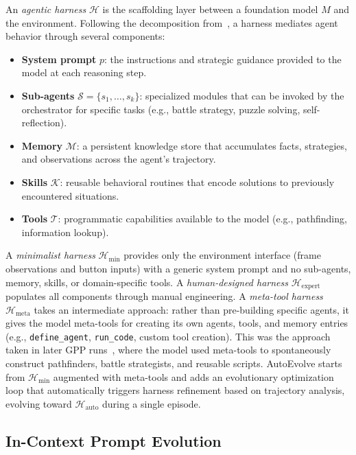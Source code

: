 An \emph{agentic harness} $\mathcal{H}$ is the scaffolding layer between a foundation model $M$ and the environment. Following the decomposition from~\citet{karten2025pokeagent}, a harness mediates agent behavior through several components:
\begin{itemize}
    \item \textbf{System prompt} $p$: the instructions and strategic guidance provided to the model at each reasoning step.
    \item \textbf{Sub-agents} $\mathcal{S} = \{s_1, \ldots, s_k\}$: specialized modules that can be invoked by the orchestrator for specific tasks (e.g., battle strategy, puzzle solving, self-reflection).
    \item \textbf{Memory} $\mathcal{M}$: a persistent knowledge store that accumulates facts, strategies, and observations across the agent's trajectory.
    \item \textbf{Skills} $\mathcal{K}$: reusable behavioral routines that encode solutions to previously encountered situations.
    \item \textbf{Tools} $\mathcal{T}$: programmatic capabilities available to the model (e.g., pathfinding, information lookup).
\end{itemize}

A \emph{minimalist harness} $\mathcal{H}_{\min}$ provides only the environment interface (frame observations and button inputs) with a generic system prompt and no sub-agents, memory, skills, or domain-specific tools. A \emph{human-designed harness} $\mathcal{H}_{\text{expert}}$ populates all components through manual engineering. A \emph{meta-tool harness} $\mathcal{H}_{\text{meta}}$ takes an intermediate approach: rather than pre-building specific agents, it gives the model meta-tools for creating its own agents, tools, and memory entries (e.g., \texttt{define\_agent}, \texttt{run\_code}, custom tool creation). This was the approach taken in later GPP runs~\citep{zhang2025gpp}, where the model used meta-tools to spontaneously construct pathfinders, battle strategists, and reusable scripts. AutoEvolve starts from $\mathcal{H}_{\min}$ augmented with meta-tools and adds an evolutionary optimization loop that automatically triggers harness refinement based on trajectory analysis, evolving toward $\mathcal{H}_{\text{auto}}$ during a single episode.

\subsection{In-Context Prompt Evolution}

